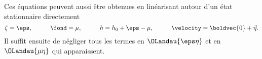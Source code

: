 Ces équations peuvent aussi être obtenues en linéarisant autour d'un état stationnaire directement
\begin{equation}
	\zeta  = \eps, \hspace{1cm} \fond = \mu,\hspace{1cm} h = h_0 + \eps - \mu,\hspace{1cm}\velocity = \boldvec{0} +  \vec{\eta}.
\end{equation}
Il suffit ensuite de négliger tous les termes en $\OLandau{\eps\eta}$ et en $\OLandau{\mu\eta}$ qui apparaissent.
%
%

